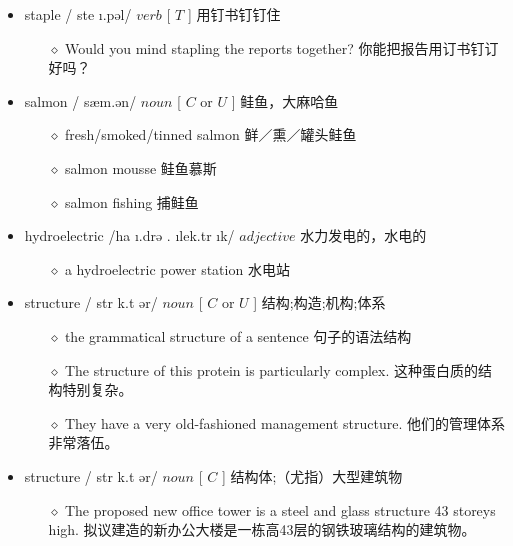 \documentclass[a4paper,top=2.5cm,buttom=2.5cm10.5pt]{book}
\begin{document}
\begin{itemize}
\item staple / \textprimstress ste \i .pəl/ $ verb $ [  $ T $  ] 用钉书钉钉住
\begin{itemize}
\item[$\diamond$] Would you mind stapling the reports together?
你能把报告用订书钉订好吗？
\end{itemize}
\end{itemize}
\begin{itemize}
\item salmon / \textprimstress sæm.ən/ $ noun $ [  $ C $  or  $ U $  ] 鲑鱼，大麻哈鱼
\begin{itemize}
\item[$\diamond$] fresh/smoked/tinned salmon
鲜／熏／罐头鲑鱼
\item[$\diamond$] salmon mousse
鲑鱼慕斯
\item[$\diamond$] salmon fishing
捕鲑鱼
\end{itemize}
\end{itemize}
\begin{itemize}
\item hydroelectric /\textsecstress ha \i .drə \textupsilon . \i  \textprimstress lek.tr \i k/ $ adjective $  水力发电的，水电的
\begin{itemize}
\item[$\diamond$] a hydroelectric power station
水电站
\end{itemize}
\end{itemize}
\begin{itemize}
\item structure / \textprimstress str \textturnv k.t \textesh ər/ $ noun $ [  $ C $  or  $ U $  ] 结构;构造;机构;体系
\begin{itemize}
\item[$\diamond$] the grammatical structure of a sentence
句子的语法结构
\item[$\diamond$] The structure of this protein is particularly complex.
这种蛋白质的结构特别复杂。
\item[$\diamond$] They have a very old-fashioned management structure.
他们的管理体系非常落伍。
\end{itemize}
\end{itemize}
\begin{itemize}
\item structure / \textprimstress str \textturnv k.t \textesh ər/ $ noun $ [  $ C $  ] 结构体;（尤指）大型建筑物
\begin{itemize}
\item[$\diamond$] The proposed new office tower is a steel and glass structure 43 storeys high.
拟议建造的新办公大楼是一栋高43层的钢铁玻璃结构的建筑物。
\end{itemize}
\end{itemize}
\end{document}
